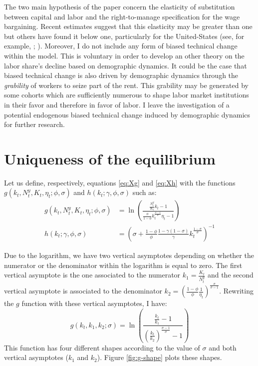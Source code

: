 \documentclass[
]{article}
\begin{document}
The two main hypothesis of the paper concern the elasticity of substitution between capital and labor and the right-to-manage specification for the wage bargaining. Recent estimates suggest that this elasticity may be greater than one \citep[see][]{Karabarbounis2014} but others have found it below one, particularly for the United-States (see, for example, \citet{Antras2004}; \citet{Chirinko2008}). Moreover, I do not include any form of biased technical change within the model. This is voluntary in order to develop an other theory on the labor share's decline based on demographic dynamics. It could be the case that biased technical change is also driven by demographic dynamics through the \emph{grability} of workers to seize part of the rent. This grability may be generated by some cohorts which are sufficiently numerous to shape labor market institutions in their favor and therefore in favor of labor. I leave the investigation of a potential endogenous biased technical change induced by demographic dynamics for further research.

\singlespacing

\hypertarget{refs}{}

\hypertarget{appendix-appendix}{%
\appendix}


\hypertarget{uniqueness}{%
\section{Uniqueness of the equilibrium}\label{uniqueness}}

Let us define, respectively, equations \eqref{eq:Xg} and \eqref{eq:Xh} with the functions \(g(k_t, N_t^y, K_t, \eta_t; \phi, \sigma)\) and \(h(k_t ; \gamma, \phi, \sigma)\) such as:
\begin{align*}
        g(k_t, N_t^y, K_t, \eta_t; \phi, \sigma) &= \ln\left( \frac{ \frac{N_t^y}{K_t} k_t - 1 } { \frac{\phi}{1-\phi} k_t^{\frac{\sigma-1}{\sigma}} \eta_t - 1 }\right) \\
        h(k_t ; \gamma, \phi, \sigma) &= \left( \sigma + \frac{1-\phi}{\phi} \frac{1-\gamma(1-\sigma)}{\gamma} k_t^{\frac{1-\sigma}{\sigma}} \right)^{-1}
\end{align*}

Due to the logarithm, we have two vertical asymptotes depending on whether the numerator or the denominator within the logarithm is equal to zero. The first vertical asymptote is the one associated to the numerator \(k_1 = \frac{K_t}{N_t^y}\) and the second vertical asymptote is associated to the denominator \(k_2 = \left(\frac{1-\phi}{\phi} \frac{1}{\eta_t}\right)^{\frac{\sigma}{\sigma-1}}\). Rewriting the \(g\) function with these vertical asymptotes, I have:
\begin{equation*}
  g(k_t, k_1, k_2; \sigma) = \ln\left( \frac{\frac{k_t}{k_1}-1}{\left(\frac{k_t}{k_2}\right)^{\frac{\sigma - 1}{\sigma}} - 1} \right)
\end{equation*}
This function has four different shapes according to the value of \(\sigma\) and both vertical asymptotes (\(k_1\) and \(k_2\)). Figure \ref{fig:g-shape} plots these shapes.
\end{document}
